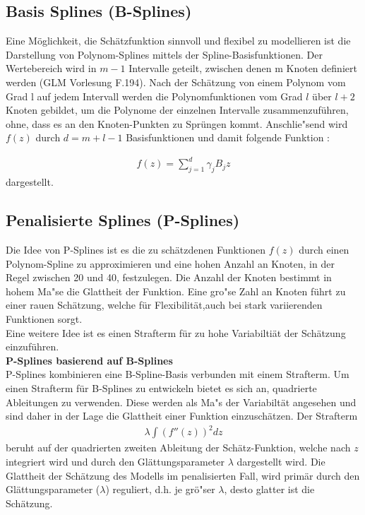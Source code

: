 \documentclass[12pt]{scrreprt}
\begin{document}
	\subsection{Basis Splines (B-Splines)}
	Eine Möglichkeit, die Schätzfunktion sinnvoll und flexibel zu modellieren ist die Darstellung von Polynom-Splines mittels der Spline-Basisfunktionen. Der Wertebereich wird in $m-1$ Intervalle geteilt, zwischen denen m Knoten definiert werden (GLM Vorlesung F.194). Nach der Schätzung von einem Polynom vom Grad l auf jedem Intervall werden die Polynomfunktionen vom Grad $l$ über $l + 2$ Knoten gebildet, um die Polynome der einzelnen Intervalle zusammenzuführen, ohne, dass es an den Knoten-Punkten zu Sprüngen kommt. Anschlie"send wird $f(z)$ durch $d = m+l-1$ Basisfunktionen und damit folgende Funktion :
	
	\begin{align}
	f(z)=\sum_{j=1}^d\gamma_{j}B_{j}z
	\end{align}
	dargestellt.\\
	
	\subsection{Penalisierte Splines (P-Splines)} 
	Die Idee von P-Splines ist es die zu schätzdenen Funktionen $f(z)$ durch einen Polynom-Spline zu approximieren und eine hohen Anzahl an Knoten, in der Regel zwischen 20 und 40, festzulegen. Die Anzahl der Knoten bestimmt in hohem Ma"se die Glattheit der Funktion. Eine gro"se Zahl an Knoten führt zu einer rauen Schätzung, welche für Flexibilität,auch bei stark variierenden Funktionen sorgt. \\
	Eine weitere Idee ist es einen Strafterm für zu hohe Variabiltiät der Schätzung einzuführen. \\
	
	\noindent\textbf{P-Splines basierend auf B-Splines} \\
	P-Splines kombinieren eine B-Spline-Basis verbunden mit einem Strafterm. Um einen Strafterm für B-Splines zu entwickeln bietet es sich an, quadrierte Ableitungen zu verwenden. Diese werden als Ma"s der Variabiltät angesehen und sind daher in der Lage die Glattheit einer Funktion einzuschätzen.
	Der Strafterm 
	\begin{align}
	\lambda\int(f''(z))^2dz
	\end{align}
	beruht auf der quadrierten zweiten Ableitung der Schätz-Funktion, welche nach $z$ integriert wird und durch den Glättungsparameter $\lambda$ dargestellt wird. Die Glattheit der Schätzung des Modells im penalisierten Fall, wird primär durch den Glättungsparameter ($\lambda$) reguliert, d.h. je grö"ser $\lambda$, desto glatter ist die Schätzung.\\
	
\end{document}
